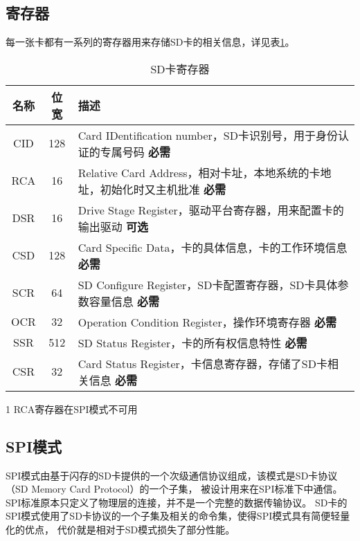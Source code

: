 \subsection{寄存器}
\label{sec:register}
每一张卡都有一系列的寄存器用来存储SD卡的相关信息，详见表\ref{tab:reg}。
\begin{table}[!htb]
    \centering
    \caption{SD卡寄存器}\label{tab:reg}
\begin{threeparttable}
    \begin{tabular}{ccp{7cm}}
    \toprule
    名称 & 位宽 & 描述 \\ \midrule
    CID & 128 & Card IDentification number，SD卡识别号，用于身份认证的专属号码 \textbf{必需} \\ \midrule
    RCA\tnote{1} & 16 & Relative Card Address，相对卡址，本地系统的卡地址，初始化时又主机批准 \textbf{必需} \\\midrule
    DSR & 16 & Drive Stage Register，驱动平台寄存器，用来配置卡的输出驱动 \textbf{可选} \\ \midrule
    CSD & 128 & Card Specific Data，卡的具体信息，卡的工作环境信息 \textbf{必需} \\ \midrule
    SCR & 64 & SD Configure Register，SD卡配置寄存器，SD卡具体参数容量信息 \textbf{必需} \\ \midrule
    OCR & 32 & Operation Condition Register，操作环境寄存器 \textbf{必需} \\ \midrule
    SSR & 512 & SD Status Register，卡的所有权信息特性 \textbf{必需}\\ \midrule
    CSR & 32 & Card Status Register，卡信息寄存器，存储了SD卡相关信息 \textbf{必需} \\
    \bottomrule
    \end{tabular}
    \begin{tablenotes}
    \item [1] RCA寄存器在SPI模式不可用
    \end{tablenotes}
\end{threeparttable}
\end{table}

\subsection{SPI模式}
\label{sec:spimode}
SPI模式由基于闪存的SD卡提供的一个次级通信协议组成，该模式是SD卡协议（SD Memory Card Protocol）的一个子集，
被设计用来在SPI标准下中通信。
SPI标准原本只定义了物理层的连接，并不是一个完整的数据传输协议。
SD卡的SPI模式使用了SD卡协议的一个子集及相关的命令集，使得SPI模式具有简便轻量化的优点，
代价就是相对于SD模式损失了部分性能。

